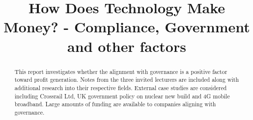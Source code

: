 \documentclass{elec6049Report}     %
\newcommand{\inote}[1] {\todo[inline]{#1}}
\begin{document}
\frontmatter
{}
\title      {How Does Technology Make Money? - Compliance, Government and other factors}

\maketitle
{}
{}
\begin{abstract}
This report investigates whether the alignment with governance is a positive factor toward profit generation.
Notes from the three invited lecturers are included along with additional research into their respective fields.
External case studies are considered including Crossrail Ltd, UK government policy on nuclear new build and 4G mobile broadband.
Large amounts of funding are available to companies aligning with governance. 

\end{abstract}
\mainmatter





\backmatter


\appendix



 
\end{document}
